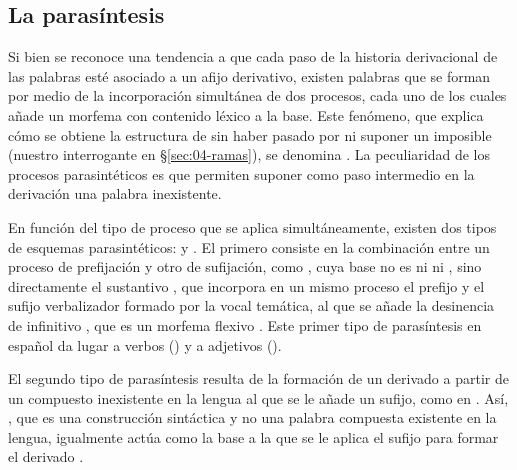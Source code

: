 \subsection{La parasíntesis}\label{sec:04-parasintesis}

Si bien se reconoce una tendencia a que cada paso de la historia derivacional de
las palabras esté asociado a un afijo derivativo, existen palabras que se forman
por medio de la incorporación simultánea de dos procesos, cada uno de los cuales
añade un morfema con contenido léxico a la base. Este fenómeno, que explica cómo
se obtiene la estructura de  sin haber pasado por
 ni suponer un imposible  (nuestro
interrogante en §\ref{sec:04-ramas}), se denomina . La
peculiaridad de los procesos parasintéticos es que permiten suponer como paso
intermedio en la derivación una palabra inexistente.

En función del tipo de proceso que se aplica simultáneamente, existen dos tipos
de esquemas parasintéticos:  y . El primero consiste en la combinación entre un proceso de
prefijación y otro de sufijación, como , cuya base no es ni
 ni , sino directamente el
sustantivo , que incorpora en un mismo proceso el prefijo
 y el sufijo verbalizador formado por la vocal temática, al que se
añade la desinencia de infinitivo , que es un morfema flexivo
\parencite[4702]{serranodolader1999}. Este primer tipo de parasíntesis en
español da lugar a verbos () y a
adjetivos ().

El segundo tipo de parasíntesis resulta de la formación de un derivado a partir
de un compuesto inexistente en la lengua al que se le añade un sufijo, como en
. Así, , que es una construcción
sintáctica y no una palabra compuesta existente en la lengua, igualmente actúa
como la base a la que se le aplica el sufijo  para formar el
derivado .

